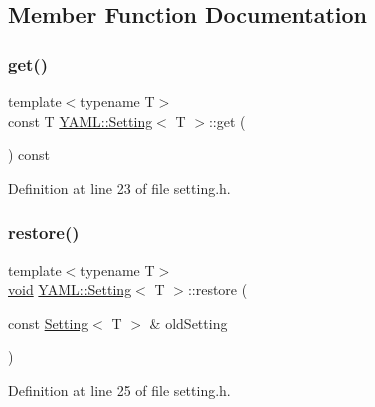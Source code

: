\subsection{Member Function Documentation}
\mbox{\label{class_y_a_m_l_1_1_setting_a867bf7d693eb31438577ca0c9ee6205e}} 
\subsubsection{\texorpdfstring{get()}{get()}}
{\footnotesize\ttfamily template$<$typename T$>$ \\
const T \mbox{\hyperlink{class_y_a_m_l_1_1_setting}{Y\+A\+M\+L\+::\+Setting}}$<$ T $>$\+::get (\begin{DoxyParamCaption}{ }\end{DoxyParamCaption}) const\hspace{0.3cm}{\ttfamily [inline]}}



Definition at line 23 of file setting.\+h.

\mbox{\label{class_y_a_m_l_1_1_setting_a4835f946c5bf1c99b351a405cfb81838}} 
\subsubsection{\texorpdfstring{restore()}{restore()}}
{\footnotesize\ttfamily template$<$typename T$>$ \\
\mbox{\hyperlink{glad_8h_a950fc91edb4504f62f1c577bf4727c29}{void}} \mbox{\hyperlink{class_y_a_m_l_1_1_setting}{Y\+A\+M\+L\+::\+Setting}}$<$ T $>$\+::restore (\begin{DoxyParamCaption}\item[{const \mbox{\hyperlink{class_y_a_m_l_1_1_setting}{Setting}}$<$ T $>$ \&}]{old\+Setting }\end{DoxyParamCaption})\hspace{0.3cm}{\ttfamily [inline]}}



Definition at line 25 of file setting.\+h.

\mbox{\label{class_y_a_m_l_1_1_setting_ae9634ee7d2e5a32600090e17ffaab727}} 
